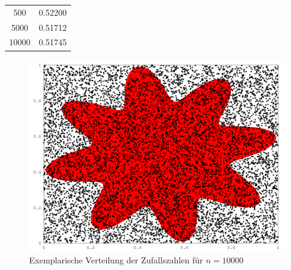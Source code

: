 \documentclass[a4paper]{scrartcl}
\begin{document}
\begin{aufgabe}
\begin{enumerate}[a)]
\begin{table}[h]
\begin{tabular}{c|r}
					500 & 0.52200 \\
					5000 & 0.51712 \\
					10000 & 0.51745
				\end{tabular}
			\end{table}
			\begin{figure}[h]
				\centering
				\caption{Exemplarische Verteilung der Zufallszahlen für $n=10000$}
				\includegraphics[scale=0.4]{num1_9_4/c.png}
			\end{figure}
						
	\end{enumerate}
\end{aufgabe}
\end{document}
